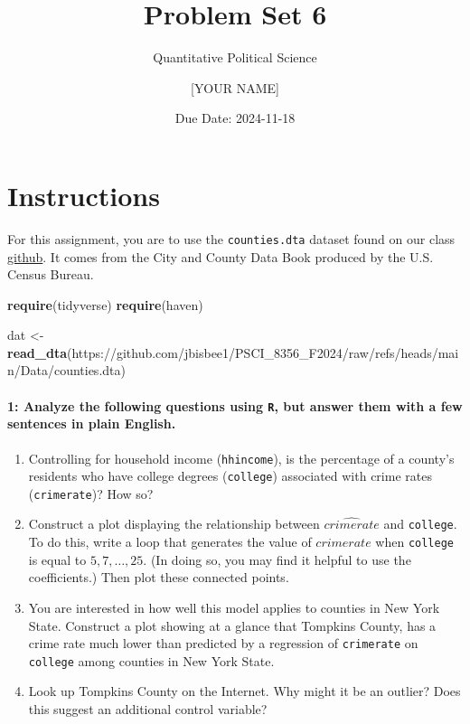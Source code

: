 \documentclass[
]{article}
\title{Problem Set 6}
\subtitle{Quantitative Political Science}
\author{{[}YOUR NAME{]}}
\date{Due Date: 2024-11-18}
\newenvironment{Shaded}{\begin{snugshade}}{\end{snugshade}}
\newcommand{\FunctionTok}[1]{\textcolor[rgb]{0.13,0.29,0.53}{\textbf{#1}}}
\newcommand{\NormalTok}[1]{#1}
\newcommand{\OtherTok}[1]{\textcolor[rgb]{0.56,0.35,0.01}{#1}}
\newcommand{\StringTok}[1]{\textcolor[rgb]{0.31,0.60,0.02}{#1}}
\begin{document}
\maketitle

\section{Instructions}\label{instructions}

For this assignment, you are to use the \texttt{counties.dta} dataset
found on our class
\href{https://github.com/jbisbee1/PSCI_8356_F2024/raw/refs/heads/main/Data/counties.dta}{github}.
It comes from the City and County Data Book produced by the U.S. Census
Bureau.

\begin{Shaded}
\begin{Highlighting}[]
\FunctionTok{require}\NormalTok{(tidyverse)}
\FunctionTok{require}\NormalTok{(haven)}

\NormalTok{dat }\OtherTok{\textless{}{-}} \FunctionTok{read\_dta}\NormalTok{(}\StringTok{\textquotesingle{}https://github.com/jbisbee1/PSCI\_8356\_F2024/raw/refs/heads/main/Data/counties.dta\textquotesingle{}}\NormalTok{)}
\end{Highlighting}
\end{Shaded}

\paragraph{\texorpdfstring{1: Analyze the following questions using
\texttt{R}, but answer them with a few sentences in plain
English.}{1: Analyze the following questions using R, but answer them with a few sentences in plain English.}}\label{analyze-the-following-questions-using-r-but-answer-them-with-a-few-sentences-in-plain-english.}

\begin{enumerate}
\def\labelenumi{\alph{enumi}.}
\item
  Controlling for household income (\texttt{hhincome}), is the
  percentage of a county's residents who have college degrees
  (\texttt{college}) associated with crime rates (\texttt{crimerate})?
  How so?
\item
  Construct a plot displaying the relationship between
  \(\widehat{\textit{crimerate}}\) and \texttt{college}. To do this,
  write a loop that generates the value of
  \(\widehat{\textit{crimerate}}\) when \texttt{college} is equal to
  \(5, 7,\dots,25\). (In doing so, you may find it helpful to use the
  coefficients.) Then plot these connected points.
\item
  You are interested in how well this model applies to counties in New
  York State. Construct a plot showing at a glance that Tompkins County,
  has a crime rate much lower than predicted by a regression of
  \texttt{crimerate} on \texttt{college} among counties in New York
  State.
\item
  Look up Tompkins County on the Internet. Why might it be an outlier?
  Does this suggest an additional control variable?
\end{enumerate}
\end{document}
